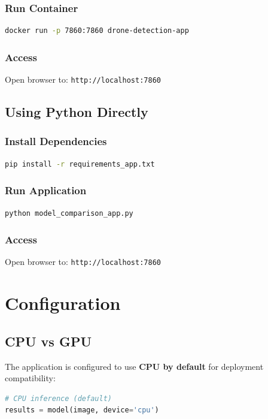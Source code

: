 \documentclass[11pt,a4paper]{article}
\begin{document}
\subsubsection{Run Container}
\begin{lstlisting}[language=bash]
docker run -p 7860:7860 drone-detection-app
\end{lstlisting}

\subsubsection{Access}
Open browser to: \texttt{http://localhost:7860}

\subsection{Using Python Directly}

\subsubsection{Install Dependencies}
\begin{lstlisting}[language=bash]
pip install -r requirements_app.txt
\end{lstlisting}

\subsubsection{Run Application}
\begin{lstlisting}[language=bash]
python model_comparison_app.py
\end{lstlisting}

\subsubsection{Access}
Open browser to: \texttt{http://localhost:7860}

\section{Configuration}

\subsection{CPU vs GPU}

The application is configured to use \textbf{CPU by default} for deployment compatibility:

\begin{lstlisting}[language=Python]
# CPU inference (default)
results = model(image, device='cpu')
\end{lstlisting}
\end{document}
